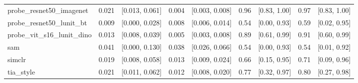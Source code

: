 \begin{tabular}{lrrrrrrrr}
probe\_resnet50\_imagenet & 0.021 & [0.013, 0.061] & 0.004 & [0.003, 0.008] & 0.96 & [0.83, 1.00] & 0.97 & [0.83, 1.00] \\
probe\_resnet50\_lunit\_bt & 0.009 & [0.000, 0.028] & 0.008 & [0.006, 0.014] & 0.54 & [0.00, 0.93] & 0.59 & [0.02, 0.95] \\
probe\_vit\_s16\_lunit\_dino & 0.013 & [0.008, 0.039] & 0.005 & [0.003, 0.008] & 0.89 & [0.61, 0.99] & 0.91 & [0.60, 0.99] \\
sam & 0.041 & [0.000, 0.130] & 0.038 & [0.026, 0.066] & 0.54 & [0.00, 0.93] & 0.54 & [0.01, 0.92] \\
simclr & 0.019 & [0.008, 0.058] & 0.013 & [0.009, 0.024] & 0.66 & [0.15, 0.95] & 0.71 & [0.09, 0.96] \\
tia\_style & 0.021 & [0.011, 0.062] & 0.012 & [0.008, 0.020] & 0.77 & [0.32, 0.97] & 0.80 & [0.27, 0.98] \\
\bottomrule
\end{tabular}

